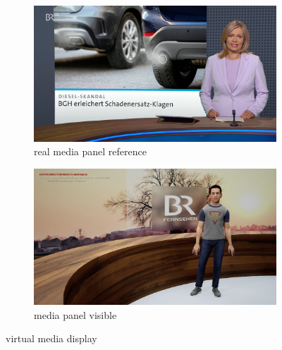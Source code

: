 \documentclass[
  a4paper,  %
  twoside,  %
  bibliography=totoc,
  headsepline,
  cleardoublepage=empty,
  parskip=half,
  draft=false
]{scrbook}
\begin{document}
\begin{figure}[h]
  \centering
  \begin{subfigure}{0.45\textwidth}
    \includegraphics[width=\linewidth]{graphics/images/unreal-engine/media/slide-real.png}
    \caption{real media panel reference}
  \end{subfigure}
  \begin{subfigure}{0.45\textwidth}
    \includegraphics[width=\linewidth]{graphics/images/unreal-engine/media/slide-inplace.png}
    \caption{media panel visible}
  \end{subfigure}
  \caption{virtual media display}
  \label{fig:ue-media}
\end{figure}
\end{document}
